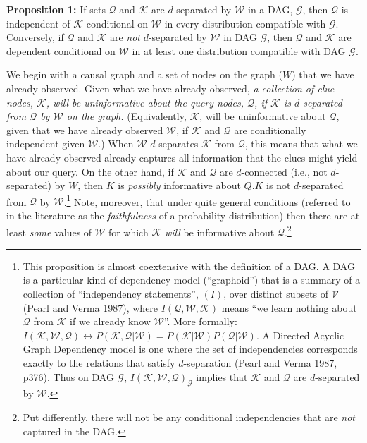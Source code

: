 \documentclass[
  12pt,
]{book}
\begin{document}
\textbf{Proposition 1:} If sets \(\mathcal Q\) and \(\mathcal K\) are \(d\)-separated by \(\mathcal W\) in a DAG, \(\mathcal G\), then \(\mathcal Q\) is independent of \(\mathcal K\) conditional on \(\mathcal W\) in every distribution compatible with \(\mathcal G\). Conversely, if \(\mathcal Q\) and \(\mathcal K\) are \emph{not} \(d\)-separated by \(\mathcal W\) in DAG \(\mathcal G\), then \(\mathcal Q\) and \(\mathcal K\) are dependent conditional on \(\mathcal W\) in at least one distribution compatible with DAG \(\mathcal G\).

We begin with a causal graph and a set of nodes on the graph (\(W\)) that we have already observed. Given what we have already observed, \emph{a collection of clue nodes, \(\mathcal K\), will be uninformative about the query nodes, \(\mathcal Q\), if \(\mathcal K\) is \(d\)-separated from \(\mathcal Q\) by \(\mathcal W\) on the graph.} (Equivalently, \(\mathcal K\), will be uninformative about \(\mathcal Q\), given that we have already observed \(\mathcal W\), if \(\mathcal K\) and \(\mathcal Q\) are conditionally independent given \(\mathcal W\).) When \(\mathcal W\) \(d\)-separates \(\mathcal K\) from \(\mathcal Q\), this means that what we have already observed already captures all information that the clues might yield about our query. On the other hand, if \(\mathcal K\) and \(\mathcal Q\) are \(d\)-connected (i.e., not \(d\)-separated) by \(W\), then \(K\) is \emph{possibly} informative about \(Q\).\(K\) is not \(d\)-separated from \(\mathcal Q\) by \(\mathcal W\).\footnote{This proposition is almost coextensive with the definition of a DAG. A DAG is a particular kind of dependency model (``graphoid'') that is a summary of a collection of ``independency statements'', \((I)\), over distinct subsets of \(\mathcal V\) (Pearl and Verma 1987), where \(I(\mathcal Q,\mathcal W,\mathcal K)\) means ``we learn nothing about \(\mathcal Q\) from \(\mathcal K\) if we already know \(\mathcal W\)''. More formally:
  \(I(\mathcal K, \mathcal W,\mathcal Q) \leftrightarrow P(\mathcal K,\mathcal Q|\mathcal W)=P(\mathcal K|\mathcal W)P(\mathcal Q|\mathcal W)\). A Directed Acyclic Graph Dependency model is one where the set of independencies corresponds exactly to the relations that satisfy \(d\)-separation (Pearl and Verma 1987, p376). Thus on DAG \(\mathcal G\), \(I(\mathcal K,\mathcal W,\mathcal Q)_{\mathcal G}\) implies that \(\mathcal K\) and \(\mathcal Q\) are \(d\)-separated by \(\mathcal W\).} Note, moreover, that under quite general conditions (referred to in the literature as the \emph{faithfulness} of a probability distribution) then there are at least \emph{some} values of \(\mathcal W\) for which \(\mathcal K\) \emph{will} be informative about \(\mathcal Q\).\footnote{Put differently, there will not be any conditional independencies that are \emph{not} captured in the DAG.}
\end{document}
